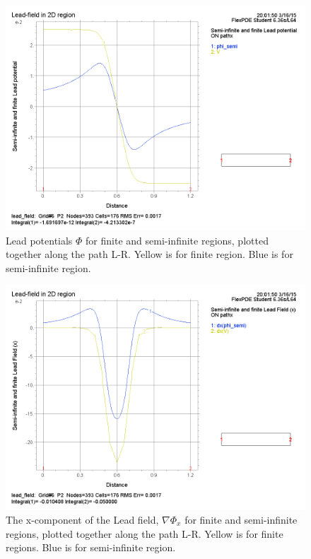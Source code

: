 \documentclass{article}
\begin{document}
\begin{figure}[H]
    \begin{center}
        \includegraphics[scale=0.5]{lead_potential.png}
        \caption{Lead potentials $\Phi$ for finite and semi-infinite regions, plotted together along the path L-R. Yellow is for finite region. Blue is for semi-infinite region.}
    \end{center}
\end{figure}

\begin{figure}[H]
    \begin{center}
        \includegraphics[scale=0.5]{lead_field_x.png}
        \caption{The x-component of the Lead field, $\nabla \Phi_x$ for finite and semi-infinite regions, plotted together along the path L-R. Yellow is for finite regions. Blue is for semi-infinite region.}
    \end{center}
\end{figure}
\end{document}
